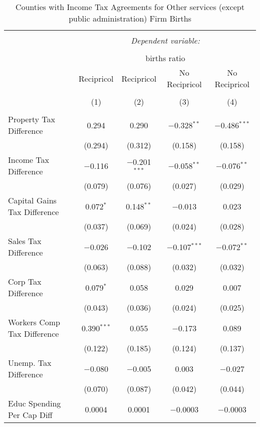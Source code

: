 
\begin{table}[!htbp] \centering 
  \caption{Counties with Income Tax Agreements for  Other services (except public administration) Firm Births} 
  \label{81agreement} 
\begin{tabular}{@{\extracolsep{5pt}}lcccc} 
\\[-1.8ex]\hline 
\hline \\[-1.8ex] 
 & \multicolumn{4}{c}{\textit{Dependent variable:}} \\ 
\cline{2-5} 
\\[-1.8ex] & \multicolumn{4}{c}{births ratio} \\ 
 & Recipricol & Recipricol & No Recipricol & No Recipricol \\ 
\\[-1.8ex] & (1) & (2) & (3) & (4)\\ 
\hline \\[-1.8ex] 
 Property Tax Difference & 0.294 & 0.290 & $-$0.328$^{**}$ & $-$0.486$^{***}$ \\ 
  & (0.294) & (0.312) & (0.158) & (0.158) \\ 
  Income Tax Difference & $-$0.116 & $-$0.201$^{***}$ & $-$0.058$^{**}$ & $-$0.076$^{**}$ \\ 
  & (0.079) & (0.076) & (0.027) & (0.029) \\ 
  Capital Gains Tax Difference & 0.072$^{*}$ & 0.148$^{**}$ & $-$0.013 & 0.023 \\ 
  & (0.037) & (0.069) & (0.024) & (0.028) \\ 
  Sales Tax Difference & $-$0.026 & $-$0.102 & $-$0.107$^{***}$ & $-$0.072$^{**}$ \\ 
  & (0.063) & (0.088) & (0.032) & (0.032) \\ 
  Corp Tax Difference & 0.079$^{*}$ & 0.058 & 0.029 & 0.007 \\ 
  & (0.043) & (0.036) & (0.024) & (0.025) \\ 
  Workers Comp Tax Difference & 0.390$^{***}$ & 0.055 & $-$0.173 & 0.089 \\ 
  & (0.122) & (0.185) & (0.124) & (0.137) \\ 
  Unemp. Tax Difference & $-$0.080 & $-$0.005 & 0.003 & $-$0.027 \\ 
  & (0.070) & (0.087) & (0.042) & (0.044) \\ 
  Educ Spending Per Cap Diff & 0.0004 & 0.0001 & $-$0.0003 & $-$0.0003 \\ 

\end{tabular}
\end{table}
